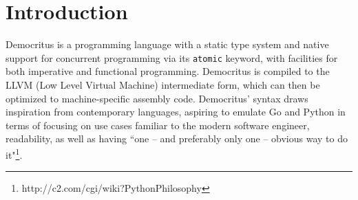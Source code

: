 \chapter{Introduction}

Democritus is a programming language with a static type system and native support for concurrent programming via its \texttt{atomic} keyword, with facilities for both imperative and functional programming. Democritus is compiled to the LLVM (Low Level Virtual Machine) intermediate form, which can then be optimized to machine-specific assembly code. Democritus' syntax draws inspiration from contemporary languages, aspiring to emulate Go and Python in terms of focusing on use cases familiar to the modern software engineer, readability, as well as having ``one -- and preferably only one -- obvious way to do it"\footnote[1]{http://c2.com/cgi/wiki?PythonPhilosophy}.
